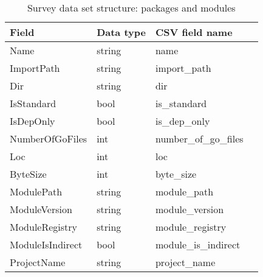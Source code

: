         \begin{table}[h]
            \centering
            \caption{Survey data set structure: packages and modules}
            \label{tbl:datastructure-packages-modules}
            \begin{tabular}{llll}
                \toprule
                Field & Data type & CSV field name \\
                \midrule
                Name               & string   & name \\
                ImportPath         & string   & import\_path \\
                Dir                & string   & dir \\
                IsStandard         & bool     & is\_standard \\
                IsDepOnly          & bool     & is\_dep\_only \\
                NumberOfGoFiles    & int      & number\_of\_go\_files \\
                Loc                & int      & loc \\
                ByteSize           & int      & byte\_size \\
                ModulePath         & string   & module\_path \\
                ModuleVersion      & string   & module\_version \\
                ModuleRegistry     & string   & module\_registry \\
                ModuleIsIndirect   & bool     & module\_is\_indirect \\
                ProjectName        & string   & project\_name \\
                \bottomrule
            \end{tabular}
        \end{table}

